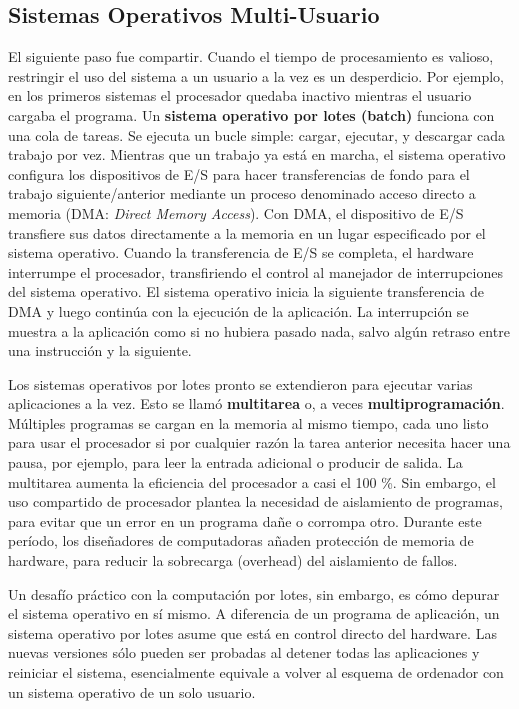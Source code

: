\documentclass[10pt]{book}
\begin{document}
\subsection{Sistemas Operativos Multi-Usuario}
El siguiente paso fue compartir. Cuando el tiempo de procesamiento es valioso, restringir el uso del sistema a un usuario a la vez es un desperdicio. Por ejemplo, en los primeros sistemas el procesador quedaba inactivo mientras el usuario cargaba el programa. Un \textbf{sistema operativo por lotes (batch)} funciona con una cola de tareas. Se ejecuta un bucle simple: cargar, ejecutar, y descargar cada trabajo por vez. Mientras que un trabajo ya está en marcha, el sistema operativo configura los dispositivos de E/S para hacer transferencias de fondo para el trabajo siguiente/anterior mediante un proceso denominado acceso directo a memoria (DMA: \textit{Direct Memory Access}). Con DMA, el dispositivo de E/S transfiere sus datos directamente a la memoria en un lugar especificado por el sistema operativo. Cuando la transferencia de E/S se completa, el hardware interrumpe el procesador, transfiriendo el control al manejador de interrupciones del sistema operativo. El sistema operativo inicia la siguiente transferencia de DMA y luego continúa con la ejecución de la aplicación. La interrupción se muestra a la aplicación como si no hubiera pasado nada, salvo algún retraso entre una instrucción y la siguiente.

Los sistemas operativos por lotes pronto se extendieron para ejecutar varias aplicaciones a la vez. Esto se llamó \textbf{multitarea} o, a veces \textbf{multiprogramación}. Múltiples programas se cargan en la memoria al mismo tiempo, cada uno listo para usar el procesador si por cualquier razón la tarea anterior necesita hacer una pausa, por ejemplo, para leer la entrada adicional o producir de salida. La multitarea aumenta la eficiencia del procesador a casi el 100 \%. Sin embargo, el uso compartido de procesador plantea la necesidad de aislamiento de programas, para evitar que un error en un programa dañe o corrompa otro. Durante este período, los diseñadores de computadoras añaden protección de memoria de hardware, para reducir la sobrecarga (overhead) del aislamiento de fallos.

Un desafío práctico con la computación por lotes, sin embargo, es cómo depurar el sistema operativo en sí mismo. A diferencia de un programa de aplicación, un sistema operativo por lotes asume que está en control directo del hardware. Las nuevas versiones sólo pueden ser probadas al detener todas las aplicaciones y reiniciar el sistema, esencialmente equivale a volver al esquema de ordenador con un sistema operativo de un solo usuario.
\end{document}
